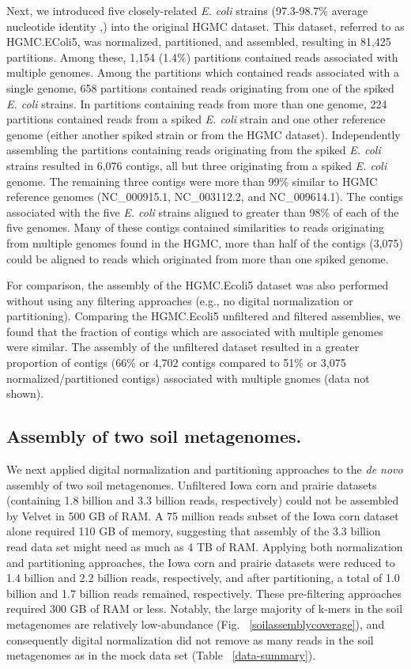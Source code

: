 \documentclass{pnastwo}
\begin{document}
\begin{article}
Next, we introduced five closely-related \emph{E. coli} strains (97.3-98.7\% average nucleotide identity 
,\cite{ani}) into the original HGMC dataset. This dataset, referred to as HGMC.EColi5, was normalized,
partitioned, and assembled, resulting in 81,425 partitions. Among these, 1,154
(1.4\%) partitions contained reads associated with multiple genomes. Among the
partitions which contained reads associated with a single genome, 658 partitions
contained reads originating from one of the spiked \emph{E. coli} strains. In
partitions containing reads from more than one genome, 224 partitions contained
reads from a spiked \emph{E. coli} strain and one other reference genome (either
another spiked strain or from the HGMC dataset). Independently assembling the
partitions containing reads originating from the spiked \emph{E. coli} strains
resulted in 6,076 contigs, all but three originating from a spiked \emph{E.
coli} genome. The remaining three contigs were more than 99\% similar to HGMC
reference genomes (NC\_000915.1, NC\_003112.2, and NC\_009614.1). The contigs
associated with the five \emph{E. coli} strains aligned to greater than 98\% of
each of the five genomes. Many of these contigs contained similarities to reads
originating from multiple genomes found in the HGMC, more than half of the contigs (3,075) 
could be aligned to reads which originated from more than one spiked genome.

For comparison, the assembly of the HGMC.Ecoli5 dataset was also performed
without using any filtering approaches (e.g., no digital normalization or
partitioning). Comparing the HGMC.Ecoli5 unfiltered and filtered assemblies, we
found that the fraction of contigs which are associated with multiple genomes
were similar.  The assembly of the unfiltered dataset resulted in a greater proportion of contigs (66\% or 4,702 contigs compared to 51\% or 3,075 normalized/partitioned contigs) associated with multiple gnomes (data not shown).

\subsection*{Assembly of two soil metagenomes.} We next applied digital
normalization and partitioning approaches to the {\em de novo} assembly of two
soil metagenomes. Unfiltered Iowa corn and prairie datasets (containing 1.8
billion and 3.3 billion reads, respectively) could not be assembled by Velvet in
500 GB of RAM. A 75 million reads subset of the Iowa corn dataset alone required
110 GB of memory, suggesting that assembly of the 3.3 billion read data set
might need as much as 4 TB of RAM. Applying both normalization and partitioning approaches, 
the Iowa corn and prairie datasets were reduced to
1.4 billion and 2.2 billion reads, respectively, and after partitioning, a total
of 1.0 billion and 1.7 billion reads remained, respectively. These pre-filtering
approaches required 300 GB of RAM or less. Notably, the large majority of k-mers
in the soil metagenomes are relatively low-abundance (Fig.
~\ref{soilassemblycoverage}), and consequently digital normalization did not
remove as many reads in the soil metagenomes as in the mock data set (Table
~\ref{data-summary}).


\end{article}
\end{document}
